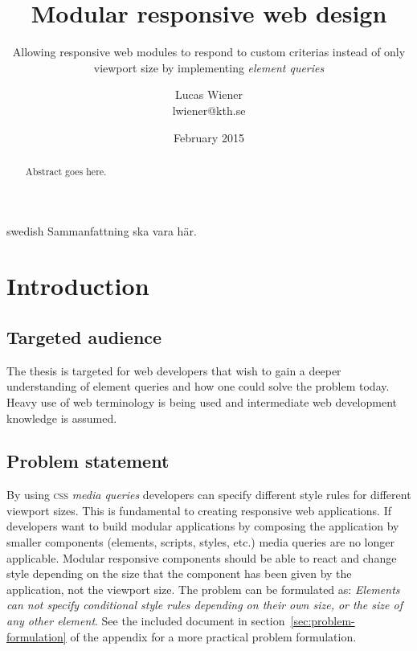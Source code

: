 \documentclass[a4paper,11pt]{kth-mag}
\title{Modular responsive web design}
\subtitle{Allowing responsive web modules to respond to custom criterias instead of only viewport size by implementing \emph{element queries}}
\author{Lucas Wiener \\ \lowercase{lwiener@kth.se}}
\date{February 2015}
\begin{document}
  \frontmatter
  \pagestyle{empty}
  \removepagenumbers
  \maketitle
  \begin{abstract}
    Abstract goes here.
  \end{abstract}
  \clearpage
  \begin{foreignabstract}{swedish}
    Sammanfattning ska vara här.
  \end{foreignabstract}
  \clearpage
  \tableofcontents*
  \listoftodos
  \mainmatter
  \pagestyle{newchap}
  \chapter{Introduction}
    \section{Targeted audience}
      The thesis is targeted for web developers that wish to gain a deeper understanding of element queries and how one could solve the problem today.
      Heavy use of web terminology is being used and intermediate web development knowledge is assumed.
    \section{Problem statement}
      By using \textsc{css} \emph{media queries} developers can specify different style rules for different viewport sizes.
      This is fundamental to creating responsive web applications.
      If developers want to build modular applications by composing the application by smaller components (elements, scripts, styles, etc.) media queries are no longer applicable.
      Modular responsive components should be able to react and change style depending on the size that the component has been given by the application, not the viewport size.
      The problem can be formulated as: \emph{Elements can not specify conditional style rules depending on their own size, or the size of any other element}.
      See the included document in section~\ref{sec:problem-formulation} of the appendix for a more practical problem formulation.
\end{document}

